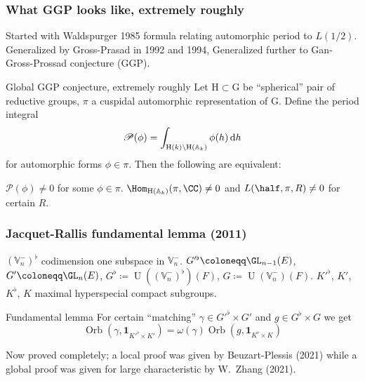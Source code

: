 \documentclass[11pt]{beamer}
\DeclareMathOperator{\Orb}{Orb}
\DeclareMathOperator{\U}{U}
\newcommand{\VV}{\mathbb{V}}
\newcommand{\G}{\mathrm{G}}
\renewcommand{\H}{\mathrm{H}}
\begin{document}
\begin{frame}
  \frametitle{What GGP looks like, extremely roughly}
  \begin{itemize}
  \ii Started with Waldspurger 1985 formula
    relating automorphic period to $L(1/2)$.
  \ii Generalized by Gross-Prasad in 1992 and 1994,
  \ii Generalized further to Gan-Gross-Prossad conjecture (GGP).
  \end{itemize}
  \begin{exampleblock}{Global GGP conjecture, extremely roughly}
    Let $\H \subset \G$ be ``spherical'' pair of reductive groups,
    $\pi$ a cuspidal automorphic representation of $\G$.
    Define the period integral
    \[ \mathscr P(\phi) = \int_{\H(k) \backslash \H(\mathbb A_k)} \phi(h) \odif h \]
    for automorphic forms $\phi \in \pi$.
    Then the following are equivalent:
    \begin{enumerate}
      \ii $\mathscr P(\phi) \neq 0$ for some $\phi \in \pi$.
      \ii $\Hom_{\H(\mathbb A_k)}(\pi, \CC) \neq 0$ and $L(\half, \pi , R) \neq 0$
      for certain $R$.
    \end{enumerate}
  \end{exampleblock}
\end{frame}

\begin{frame}
  \frametitle{Jacquet-Rallis fundamental lemma (2011)}
  \begin{itemize}
  \ii $(\VV_n^-)^\flat$ codimension one subspace in $\VV_n^-$.
  \ii $G'^\flat \coloneqq \GL_{n-1}(E)$, $G' \coloneqq \GL_n(E)$,
    $G^\flat \coloneqq \U((\VV_n^-)^\flat)(F)$, $G \coloneqq \U(\VV_n^-)(F)$.
  \ii $K'^\flat$, $K'$, $K^\flat$, $K$ maximal hyperspecial compact subgroups.
  \end{itemize}
  \begin{block}{Fundamental lemma}
    For certain ``matching''
    $\gamma \in G'^\flat \times G'$ and $g \in G^\flat \times G$
    we get
   \[ \Orb(\gamma, \mathbf{1}_{K'^\flat \times K'}) = \omega(\gamma) \Orb(g, \mathbf{1}_{K^\flat \times K}) \]
  \end{block}
  Now proved completely; a local proof was given by Beuzart-Plessis (2021)
  while a global proof was given for large characteristic by W.\ Zhang (2021).
\end{frame}
\end{document}
